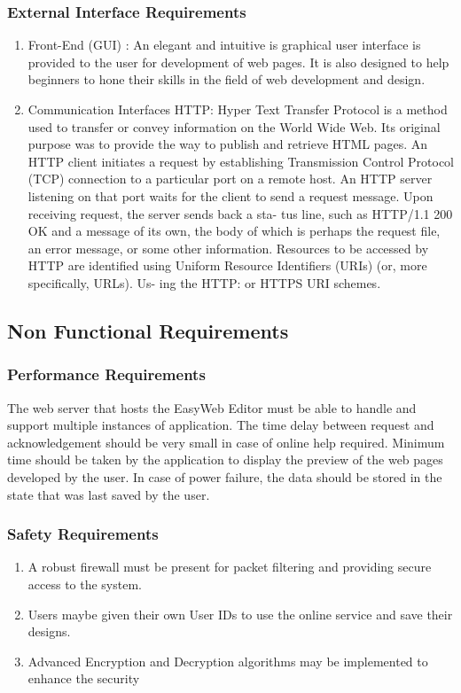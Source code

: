 \documentclass[12pt,a4paper]{article}
\begin{document}
\subsubsection{External Interface Requirements}
\begin{enumerate}
\item Front-End (GUI) : An elegant and intuitive is graphical user interface is provided to the user for development of web pages. It is also designed to help beginners to hone their skills in the field of web development and design.
\item Communication Interfaces HTTP: Hyper Text Transfer Protocol is a method used to transfer or convey information on the World Wide Web. Its original purpose was to provide the way to publish and retrieve HTML pages.
An HTTP client initiates a request by establishing Transmission Control Protocol (TCP) connection to a particular port on a remote host. An HTTP server listening on that port waits for the client to send a request message. Upon receiving request, the server sends back a sta- tus line, such as HTTP/1.1 200 OK and a message of its own, the body of which is perhaps the request file, an error message, or some other information. Resources to be accessed by HTTP are identified using Uniform Resource Identifiers (URIs) (or, more specifically, URLs). Us- ing the HTTP: or HTTPS URI schemes.

\end{enumerate}

\subsection{Non Functional Requirements}
\subsubsection{Performance Requirements}
The web server that hosts the EasyWeb Editor must be able to handle and support multiple instances of application. The time delay between request and acknowledgement  should be very small in case of online help required. Minimum time should be taken by the application to display the preview of the web pages developed by the user. In case of power failure, the data should be stored in the state that was last saved by the user.

\subsubsection{Safety Requirements}
\begin{enumerate}
\item A robust firewall must be present for packet filtering and providing secure access to the system.
\item Users maybe given their own User IDs to use the online service and save their designs.
\item Advanced Encryption and Decryption algorithms may be implemented to enhance the security
\end{enumerate}
\end{document}
